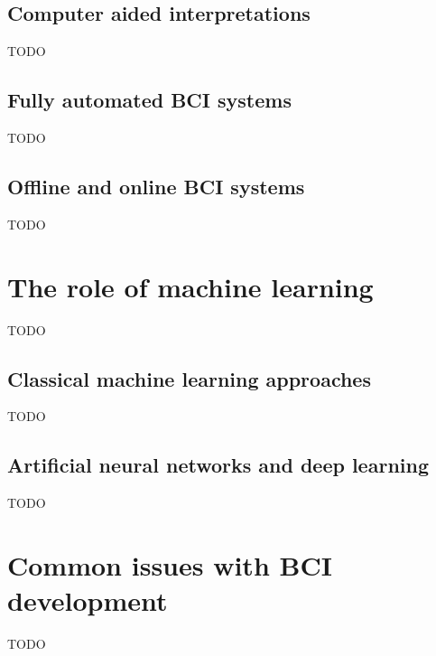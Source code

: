 
\subsection{Computer aided interpretations}
\label{subsec:processing_signals_interpreting_pc_aided}
TODO


\subsection{Fully automated BCI systems}
\label{subsec:processing_signals_interpreting_automated}
TODO


\subsection{Offline and online BCI systems}
\label{subsec:processing_signals_interpreting_offline_online}
TODO


\section{The role of machine learning}
\label{sec:processing_signals_interpreting_ml}
TODO


\subsection{Classical machine learning approaches}
\label{subsec:processing_signals_interpreting_ml_classic}
TODO


\subsection{Artificial neural networks and deep learning}
\label{subsec:processing_signals_interpreting_ml_ann_dl}
TODO



\section{Common issues with BCI development}
\label{sec:processing_signals_common_issues}
TODO

